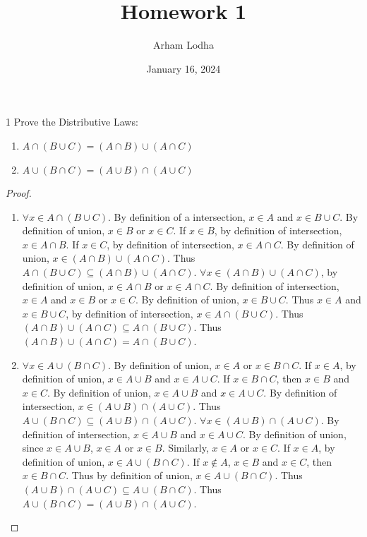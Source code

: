 \documentclass{article}
\begin{document}
\title{Homework 1}
\author{Arham Lodha}%
\date{January 16, 2024}%
\maketitle

\begin{PROB}{1}\label{Problem 1.}
    Prove the Distributive Laws:
    
    \begin{enumerate}
        \item $A \cap (B \cup C) = (A \cap B) \cup (A \cap C)$
        \item $A \cup (B \cap C) = (A \cup B) \cap (A \cup C)$ 
    \end{enumerate}
\end{PROB}
\begin{proof}
    \begin{enumerate}
        \item $\forall x \in A \cap (B \cup C)$. By definition of a intersection, $x \in A$ and $x \in B \cup C$. By definition of union, $x \in B$ or $x \in C$. If $x \in B$, by definition of intersection, $x \in A \cap B$. If $x \in C$, by definition of intersection, $x \in A \cap C$. By definition of union, $x \in (A \cap B) \cup (A \cap C)$. Thus $A \cap (B \cup C) \subseteq (A \cap B) \cup (A \cap C)$. $\forall x \in (A \cap B) \cup (A \cap C)$, by definition of union, $x \in A \cap B$ or $x \in A \cap C$. By definition of intersection, $x \in A$ and $x \in B$ or $x \in C$. By definition of union, $x \in B \cup C$. Thus $x \in A$ and $x \in B \cup C$, by definition of intersection, $x \in A \cap (B \cup C)$. Thus $(A \cap B) \cup (A \cap C) \subseteq A \cap (B \cup C)$. Thus $(A \cap B) \cup (A \cap C) = A \cap (B \cup C)$.
        

        \item $\forall x \in A \cup (B \cap C)$. By definition of union, $x \in A$ or $x \in B \cap C$. If $x \in A$, by definition of union, $x \in A \cup B$ and $x \in A \cup C$. If $x \in B \cap C$, then $x \in B$ and $x \in C$. By definition of union, $x \in A \cup B$ and $x \in A \cup C$. By definition of intersection, $x \in (A \cup B) \cap (A \cup C)$. Thus $A \cup (B \cap C) \subseteq (A \cup B) \cap (A \cup C)$. $\forall x \in (A \cup B) \cap (A \cup C)$. By definition of intersection, $x \in A \cup B$ and $x \in A \cup C$. By definition of union, since $x \in A \cup B$, $x \in A$ or $x \in B$. Similarly, $x \in A$ or $x \in C$. If $x \in A$, by definition of union, $x \in A \cup (B \cap C)$. If $x \not \in A$, $x \in B$ and $x \in C$, then $x \in B \cap C$. Thus by definition of union, $x \in A \cup (B \cap C)$. Thus $(A \cup B) \cap (A \cup C) \subseteq A \cup (B \cap C)$. Thus $A \cup (B \cap C) = (A \cup B) \cap (A \cup C)$.          
    \end{enumerate}
    
\end{proof}
\end{document}
